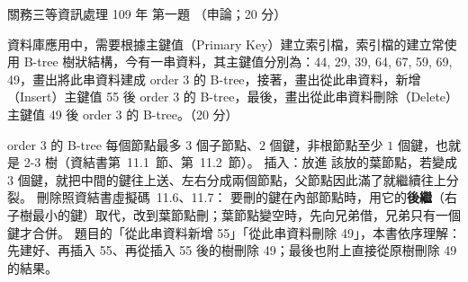 \begin{pastexam}[label={px:gw3-109-ds-01}]{關務三等資訊處理 109 年 第一題}
（申論；20 分）

資料庫應用中，需要根據主鍵值（Primary Key）建立索引檔，索引檔的建立常使用 B-tree 樹狀結構，今有一串資料，其主鍵值分別為：44, 29, 39, 64, 67, 59, 69, 49，畫出將此串資料建成 order 3 的 B-tree，接著，畫出從此串資料，新增（Insert）主鍵值 55 後 order 3 的 B-tree，最後，畫出從此串資料刪除（Delete）主鍵值 49 後 order 3 的 B-tree。（20 分）
\end{pastexam}

\begin{pastsoln}
\newcommand{\bk}[1]{\begin{tabular}{@{\,}c@{\,}}#1\end{tabular}}
\newcommand{\bkk}[2]{\begin{tabular}{@{\,}c@{\,}|@{\,}c@{\,}}#1 & #2\end{tabular}}
order $3$ 的 B-tree 每個節點最多 $3$ 個子節點、$2$ 個鍵，非根節點至少 $1$ 個鍵，也就是 2-3 樹（資結書第~11.1~節、第~11.2~節）。 插入：放進
該放的葉節點，若變成 $3$ 個鍵，就把中間的鍵往上送、左右分成兩個節點，父節點因此滿了就繼續往上分裂。 刪除照資結書虛擬碼~11.6、11.7：
要刪的鍵在內部節點時，用它的\textbf{後繼}（右子樹最小的鍵）取代，改到葉節點刪；葉節點變空時，先向兄弟借，兄弟只有一個鍵才合併。
題目的「從此串資料新增 55」「從此串資料刪除 49」，本書依序理解：先建好、再插入 55、再從插入 55 後的樹刪除 49；最後也附上直接從原樹刪除
49 的結果。


\end{pastsoln}
